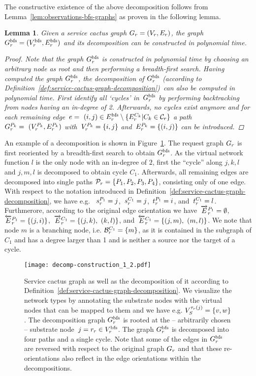 \documentclass[10pt, conference, letterpaper]{IEEEtran}
\newtheorem{lemma}[theorem]{Lemma}
\begin{document}
The constructive existence of the above decomposition follows from Lemma~\ref{lem:observations-bfs-graphs} as proven in the following lemma.

\begin{lemma}
Given a service cactus graph $\VG = (\VV,\VE)$, the graph $\VGbfs = (\VVbfs,\VEbfs)$ and its decomposition can be constructed in polynomial time.
\begin{proof}
Note that the graph $\VGbfs$ is constructed in polynomial time by choosing an arbitrary node as root and then performing a breadth-first search. Having computed the graph $\VGbfs$, the decomposition of $\VGbfs$ (according to Definition~\ref{def:service-cactus-graph-decomposition})~can also be computed in polynomial time. First identify all `cycles' in~$\VGbfs$ by performing backtracking from nodes having an in-degree of 2. Afterwards, no cycles exist anymore and for each remaining edge~$e =~(i,j) \in  \VEbfs \setminus \{\VEcycle | C_k \in \Cycles \}$ a path~$\VGpath =~(\VVpath, \VEpath)$ with~$\VVpath = \{i,j\}$ and~$\VEpath = \{(i,j)\}$ can be introduced.
\end{proof}
\end{lemma}


An example of a decomposition is shown in Figure~\ref{fig:service-cactus-request}. The request graph $\VG$ is first reoriented by a breadth-first search to obtain $\VGbfs$. As the virtual network function $l$ is the only node with an in-degree of $2$, first the ``cycle'' along $j,k,l$ and $j,m,l$ is decomposed to obtain cycle $C_1$. Afterwards, all remaining edges are decomposed into single paths $\Paths = \{P_1,P_2,P_3,P_4\}$, consisting only of one edge.
With respect to the notation introduced in Definition~\ref{def:service-cactus-graph-decomposition}, we have e.g. ~$\VVpathSource[\req][1] = j$,~$\VVcycleSource[\req][1] = j$,~$\VVpathTarget[\req][1] = i$, and~$\VVcycleTarget[\req][1] = l$. Furthmerore, according to the original edge orientation we have~$\VEpathSame[\req][1]=\emptyset$,~$\VEpathDiff[\req][1] = \{(j,i)\}$,~$\VEcycleSame[\req][1] = \{(j,k),~(k,l)\}$, and~$\VEcycleDiff[\req][1] = \{(j,m),~(m,l)\}$. We note that node $m$ is a branching node, i.e. $\VVbranchingcycle[\req][1] = \{m\}$, as it is contained in the subgraph of $C_1$ and has a degree larger than 1 and is neither a source nor the target of a cycle.


\begin{figure}[t!]
\centering
\texttt{[image: decomp-construction\_1\_2.pdf]}
\caption{Service cactus graph as well as the decomposition of it according to Definition~\ref{def:service-cactus-graph-decomposition}. We visualize the network types by annotating the substrate nodes with the virtual nodes that can be mapped to them and we have e.g. $\SVTypes[\Vtype(j)] = \{v,w\}$.
The decomposition graph $\VGbfs$ is rooted at the -- arbitrarily chosen -- substrate node~$j=\VVroot \in \VVbfs$. The graph $\VGbfs$ is decomposed into four paths and a single cycle. Note that some of the edges in $\VGbfs$ are reversed with respect to the original graph $\VG$ and that these re-orientations also reflect in the edge orientations within the decompositions.
}
\label{fig:service-cactus-request}
\end{figure}
\end{document}
